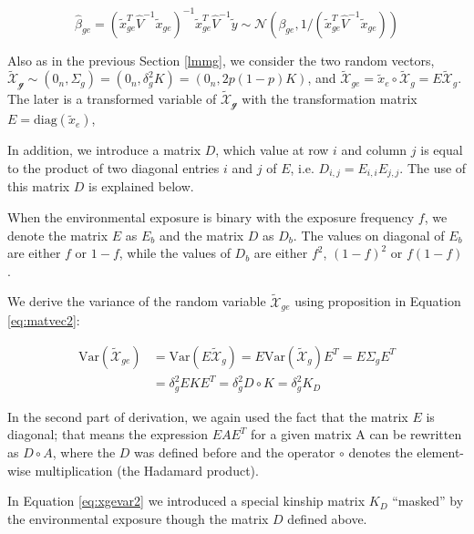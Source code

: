 \documentclass[]{book}
\begin{document}
\begin{equation}
  \hat{\beta}_{ge}  = \left(\tilde{x}_{ge}^T \hat{V}^{-1} \tilde{x}_{ge}\right)^{-1} \tilde{x}_{ge}^T \hat{V}^{-1} \tilde{y} \sim \mathcal{N} (\beta_{ge}, 1 / (\tilde{x}_{ge}^T \hat{V}^{-1} \tilde{x}_{ge}))
\label{eq:betahatlmmge}
\end{equation}

Also as in the previous Section \ref{lmmg}, we consider the two random
vectors,
\(\mathcal{\tilde{X}_g} \sim (0_n, \Sigma_g) = (0_n, \delta_g^2 K) = (0_n, 2 p (1-p) K)\),
and
\(\mathcal{\tilde{X}}_{ge} = \tilde{x}_e \circ \mathcal{\tilde{X}}_g = E \mathcal{\tilde{X}}_g\).
The later is a transformed variable of \(\mathcal{\tilde{X}_g}\) with
the transformation matrix \(E = \mathrm{diag}(\tilde{x}_e)\),

In addition, we introduce a matrix \(D\), which value at row \(i\) and
column \(j\) is equal to the product of two diagonal entries \(i\) and
\(j\) of \(E\), i.e. \(D_{i,j} = E_{i,i} E_{j,j}\). The use of this
matrix \(D\) is explained below.

When the environmental exposure is binary with the exposure frequency
\(f\), we denote the matrix \(E\) as \(E_b\) and the matrix \(D\) as
\(D_b\). The values on diagonal of \(E_b\) are either \(f\) or
\(1 - f\), while the values of \(D_b\) are either \(f^2\), \((1 - f)^2\)
or \(f (1 - f)\).

We derive the variance of the random variable
\(\mathcal{\tilde{X}}_{ge}\) using proposition in Equation
\eqref{eq:matvec2}:

\begin{equation}
\begin{split}
\mathrm{Var}(\mathcal{\tilde{X}}_{ge}) & = \mathrm{Var}(E \mathcal{\tilde{X}}_g) = E \mathrm{Var}(\mathcal{\tilde{X}}_g) E^T = E \Sigma_g E^T \\ 
 & = \delta_g^2 E K E^T = \delta_g^2 D \circ K = \delta_g^2 K_{D}
\end{split}
\label{eq:xgevar2}
\end{equation}

In the second part of derivation, we again used the fact that the matrix
\(E\) is diagonal; that means the expression \(E A E^T\) for a given
matrix A can be rewritten as \(D \circ A\), where the \(D\) was defined
before and the operator \(\circ\) denotes the element-wise
multiplication (the Hadamard product).

In Equation \eqref{eq:xgevar2} we introduced a special kinship matrix
\(K_{D}\) ``masked'' by the environmental exposure though the matrix
\(D\) defined above.
\end{document}
